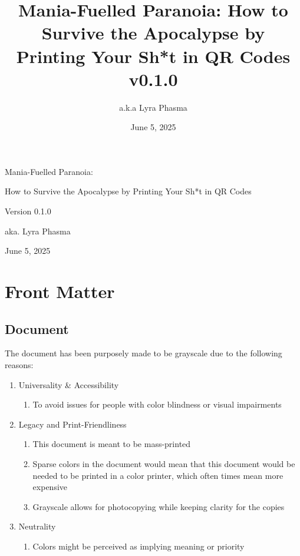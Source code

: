 \documentclass[12pt,a4paper,english,twoside]{report}
\title{Mania-Fuelled Paranoia: How to Survive the Apocalypse by Printing Your Sh*t in QR Codes v0.1.0}
\author{a.k.a Lyra Phasma}
\date{June 5, 2025}
\newcommand{\HUGE}{\fontsize{2em}{3em}\selectfont\ManropeExtraBold}
\begin{document}

\begin{titlepage}
  \centering
  \vspace*{\fill}

  {\fontsize{2.75em}{3.5em}\selectfont\ManropeExtraBold Mania-Fuelled Paranoia: \par}
  {\HUGE How to Survive the Apocalypse by Printing Your Sh*t in QR Codes \par}
  {\Large Version 0.1.0 \par}
  {\Large aka. Lyra Phasma \par}
  {\Large June 5, 2025 \par}

  \vspace*{\fill}
\end{titlepage}

\tableofcontents

\chapter{Front Matter}

\section{Document}

The document has been purposely made to be grayscale due to the following reasons:

\begin{enumerate}
  \item Universality \& Accessibility
    \begin{enumerate}[label=\alph*.]
      \item To avoid issues for people with color blindness or visual impairments
    \end{enumerate}
  \item Legacy and Print-Friendliness
    \begin{enumerate}[label=\alph*.]
      \item This document is meant to be mass-printed
      \item Sparse colors in the document would mean that this document would be needed to be printed in a color printer, which often times mean more expensive
      \item Grayscale allows for photocopying while keeping clarity for the copies
    \end{enumerate}
  \item Neutrality
    \begin{enumerate}[label=\alph*.]
      \item Colors might be perceived as implying meaning or priority
    \end{enumerate}
\end{enumerate}
\end{document}
